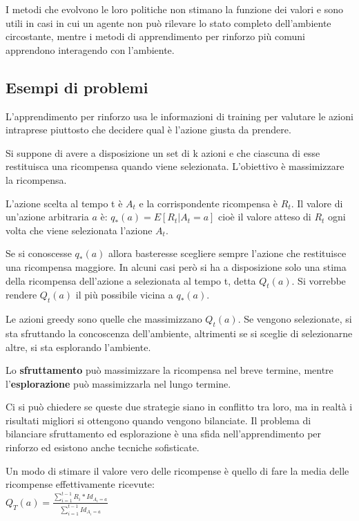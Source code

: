 I metodi che evolvono le loro politiche non stimano la funzione dei valori e sono utili
in casi in cui un agente non può rilevare lo stato completo dell'ambiente circostante,
mentre i metodi di apprendimento per rinforzo più comuni apprendono interagendo con l'ambiente.

\subsection{Esempi di problemi}

L'apprendimento per rinforzo usa le informazioni di training per valutare le azioni intraprese
piuttosto che decidere qual è l'azione giusta da prendere.

Si suppone di avere a disposizione un set di k azioni e che ciascuna di esse restituisca
una ricompensa quando viene selezionata. L'obiettivo è massimizzare la ricompensa.

L'azione scelta al tempo t è $A_t$ e la corrispondente ricompensa è $R_t$.
Il valore di un'azione arbitraria $a$ è: $q_*(a) = E[R_t | A_t = a]$ cioè il valore atteso
di $R_t$ ogni volta che viene selezionata l'azione $A_t$.

Se si conoscesse $q_*(a)$ allora basteresse scegliere sempre l'azione che restituisce una
ricompensa maggiore. In alcuni casi però si ha a disposizione solo una stima della
ricompensa dell'azione a selezionata al tempo t, detta $Q_t(a)$. Si vorrebbe rendere
$Q_t(a)$ il più possibile vicina a $q_*(a)$.

Le azioni greedy sono quelle che massimizzano $Q_t(a)$. Se vengono selezionate, si sta
sfruttando la concoscenza dell'ambiente, altrimenti se si sceglie di selezionarne altre,
si sta esplorando l'ambiente.

Lo \textbf{sfruttamento} può massimizzare la ricompensa nel breve termine, mentre
l'\textbf{esplorazione} può massimizzarla nel lungo termine.

Ci si può chiedere se queste due strategie siano in conflitto tra loro, ma in realtà
i risultati migliori si ottengono quando vengono bilanciate. Il problema
di bilanciare sfruttamento ed esplorazione è una sfida nell'apprendimento per rinforzo
ed esistono anche tecniche sofisticate.

Un modo di stimare il valore vero delle ricompense è quello di fare la media delle 
ricompense effettivamente ricevute:\\

$Q_T(a) = \frac{\sum_{i=1}^{t-1} R_i*Id_{A_i = a}}{\sum_{i=1}^{t-1} Id_{A_i = a}}$\\

